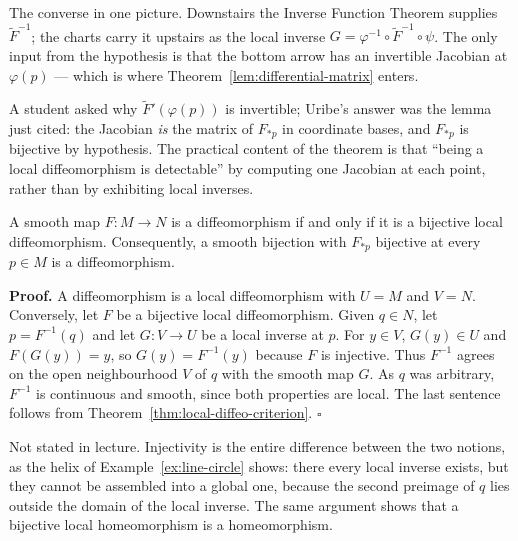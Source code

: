\documentclass[11pt]{report}
\makeatletter
\newcounter{thmcounter}[section]
\renewenvironment{proof}[1][Proof]{\noindent\textbf{#1.} }{\hfill$\square$\par\vspace{5pt}}
\newcommand{\thmlabel}[1]{\edef\@currentlabel{\arabic{section}.\arabic{thmcounter}}\label{#1}}
\newcommand{\leeref}[1]{\par\smallskip{\raggedleft\footnotesize\textsc{Lee}:\ #1\par}}
\makeatother
\begin{document}
\begin{center}
\end{center}

The converse in one picture. Downstairs the Inverse Function Theorem supplies $\tilde F^{-1}$; the charts carry it upstairs as the local inverse $G = \varphi^{-1} \circ \tilde F^{-1} \circ \psi$. The only input from the hypothesis is that the bottom arrow has an invertible Jacobian at $\varphi(p)$ --- which is where Theorem~\ref{lem:differential-matrix} enters.

A student asked why $\tilde F'(\varphi(p))$ is invertible; Uribe's answer was the lemma just cited: the Jacobian \emph{is} the matrix of $F_{*p}$ in coordinate bases, and $F_{*p}$ is bijective by hypothesis. The practical content of the theorem is that ``being a local diffeomorphism is detectable'' by computing one Jacobian at each point, rather than by exhibiting local inverses.

\begin{corbox}\thmlabel{cor:bijective-local-diffeo}
A smooth map $F : M \to N$ is a diffeomorphism if and only if it is a bijective local diffeomorphism. Consequently, a smooth bijection with $F_{*p}$ bijective at every $p \in M$ is a diffeomorphism.
\leeref{Proposition 4.6}
\end{corbox}

\begin{proof}
A diffeomorphism is a local diffeomorphism with $U = M$ and $V = N$. Conversely, let $F$ be a bijective local diffeomorphism. Given $q \in N$, let $p = F^{-1}(q)$ and let $G : V \to U$ be a local inverse at $p$. For $y \in V$, $G(y) \in U$ and $F(G(y)) = y$, so $G(y) = F^{-1}(y)$ because $F$ is injective. Thus $F^{-1}$ agrees on the open neighbourhood $V$ of $q$ with the smooth map $G$. As $q$ was arbitrary, $F^{-1}$ is continuous and smooth, since both properties are local. The last sentence follows from Theorem~\ref{thm:local-diffeo-criterion}.
\end{proof}

\begin{rembox}\label{rem:special-maps-2}
Not stated in lecture. Injectivity is the entire difference between the two notions, as the helix of Example~\ref{ex:line-circle} shows: there every local inverse exists, but they cannot be assembled into a global one, because the second preimage of $q$ lies outside the domain of the local inverse. The same argument shows that a bijective local homeomorphism is a homeomorphism.
\end{rembox}
\end{document}
